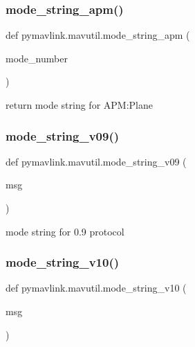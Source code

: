 \subsubsection{\texorpdfstring{mode\+\_\+string\+\_\+apm()}{mode\_string\_apm()}}
{\footnotesize\ttfamily def pymavlink.\+mavutil.\+mode\+\_\+string\+\_\+apm (\begin{DoxyParamCaption}\item[{}]{mode\+\_\+number }\end{DoxyParamCaption})}

\begin{DoxyVerb}return mode string for APM:Plane\end{DoxyVerb}
 \mbox{\label{namespacepymavlink_1_1mavutil_a783db06982d9f522333a924ab479771b}} 
\subsubsection{\texorpdfstring{mode\+\_\+string\+\_\+v09()}{mode\_string\_v09()}}
{\footnotesize\ttfamily def pymavlink.\+mavutil.\+mode\+\_\+string\+\_\+v09 (\begin{DoxyParamCaption}\item[{}]{msg }\end{DoxyParamCaption})}

\begin{DoxyVerb}mode string for 0.9 protocol\end{DoxyVerb}
 \mbox{\label{namespacepymavlink_1_1mavutil_abd1b0e50cf94d71860435e54d37ce462}} 
\subsubsection{\texorpdfstring{mode\+\_\+string\+\_\+v10()}{mode\_string\_v10()}}
{\footnotesize\ttfamily def pymavlink.\+mavutil.\+mode\+\_\+string\+\_\+v10 (\begin{DoxyParamCaption}\item[{}]{msg }\end{DoxyParamCaption})}

